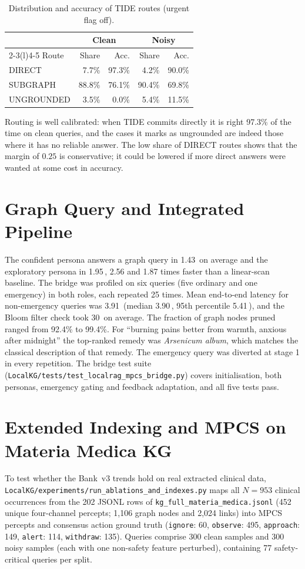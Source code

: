 \documentclass[12pt,a4paper,oneside]{report}
\newcommand{\code}[1]{\texttt{\small #1}}
\newcommand{\ms}{\,\text{ms}}
\newcommand{\us}{\,\textmu\text{s}}
\begin{document}
\begin{table}[H]
\centering
\caption{Distribution and accuracy of TIDE routes (urgent flag off).}
\label{tab:route}
\small
\begin{tabular}{@{}lrrrr@{}}
\toprule
& \multicolumn{2}{c}{Clean} & \multicolumn{2}{c}{Noisy}\\
\cmidrule(lr){2-3}\cmidrule(l){4-5}
Route & Share & Acc. & Share & Acc.\\
\midrule
DIRECT & 7.7\% & 97.3\% & 4.2\% & 90.0\%\\
SUBGRAPH & 88.8\% & 76.1\% & 90.4\% & 69.8\%\\
UNGROUNDED & 3.5\% & 0.0\% & 5.4\% & 11.5\%\\
\bottomrule
\end{tabular}
\end{table}

\noindent Routing is well calibrated: when TIDE commits directly it is right 97.3\% of the time on clean queries, and the cases it marks as ungrounded are indeed those where it has no reliable answer. The low share of DIRECT routes shows that the margin of $0.25$ is conservative; it could be lowered if more direct answers were wanted at some cost in accuracy.

\section{Graph Query and Integrated Pipeline}
The confident persona answers a graph query in 1.43\ms{} on average and the exploratory persona in 1.95\ms{}, 2.56 and 1.87 times faster than a linear-scan baseline.
The bridge was profiled on six queries (five ordinary and one emergency) in both roles, each repeated 25 times. Mean end-to-end latency for non-emergency queries was 3.91\ms{} (median 3.90\ms{}, 95th percentile 5.41\ms{}), and the Bloom filter check took 30\us{} on average. The fraction of graph nodes pruned ranged from 92.4\% to 99.4\%. For ``burning pains better from warmth, anxious after midnight'' the top-ranked remedy was \emph{Arsenicum album}, which matches the classical description of that remedy. The emergency query was diverted at stage 1 in every repetition. The bridge test suite (\code{LocalKG/tests/test\_localrag\_mpcs\_bridge.py}) covers initialisation, both personas, emergency gating and feedback adaptation, and all five tests pass.

\section{Extended Indexing and MPCS on Materia Medica KG}
To test whether the Bank~v3 trends hold on real extracted clinical data, \code{LocalKG/experiments/\allowbreak{}run\_ablations\_\allowbreak{}and\_indexes.py} maps all $N = 953$ clinical occurrences from the 202 JSONL rows of \code{kg\_full\_materia\_\allowbreak{}medica.jsonl} (452 unique four-channel percepts; 1,106 graph nodes and 2,024 links) into MPCS percepts and consensus action ground truth (\code{ignore}: 60, \code{observe}: 495, \code{approach}: 149, \code{alert}: 114, \code{withdraw}: 135). Queries comprise 300 clean samples and 300 noisy samples (each with one non-safety feature perturbed), containing 77 safety-critical queries per split.
\end{document}
